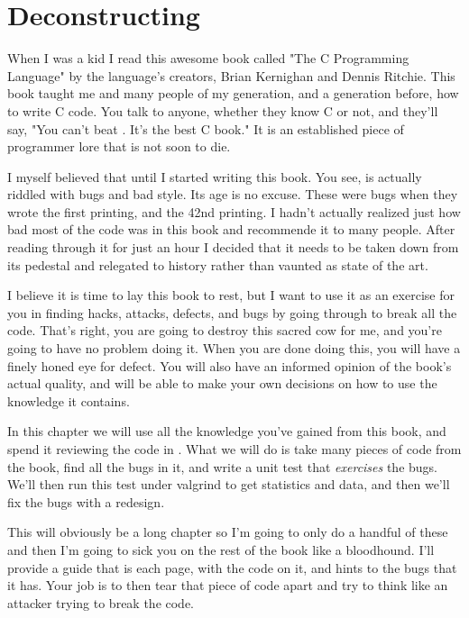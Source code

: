 \chapter{Deconstructing \krc}

When I was a kid I read this awesome book called "The C Programming Language"
by the language's creators, Brian Kernighan and Dennis Ritchie.  This book 
taught me and many people of my generation, and a generation before, how to
write C code.  You talk to anyone, whether they know C or not, and they'll
say, "You can't beat \krc. It's the best C book."  It is an established
piece of programmer lore that is not soon to die.

I myself believed that until I started writing this book. You see, \krc is
actually riddled with bugs and bad style.  Its age is no excuse. These were
bugs when they wrote the first printing, and the 42nd printing.  I hadn't
actually realized just how bad most of the code was in this book and recommende
it to many people.  After reading through it for just an hour I decided that it
needs to be taken down from its pedestal and relegated to history rather than
vaunted as state of the art.

I believe it is time to lay this book to rest, but I want to use it as an
exercise for you in finding hacks, attacks, defects, and bugs by going through
\krc to break all the code.  That's right, you are going to destroy this
sacred cow for me, and you're going to have no problem doing it.  When you are
done doing this, you will have a finely honed eye for defect.  You will also
have an informed opinion of the book's actual quality, and will be able to make
your own decisions on how to use the knowledge it contains.

In this chapter we will use all the knowledge you've gained from
this book, and spend it reviewing the code in \krc.  What we will do is
take many pieces of code from the book, find all the bugs in it, and write
a unit test that \emph{exercises} the bugs.  We'll then run this test under
valgrind to get statistics and data, and then we'll fix the bugs with a redesign.

This will obviously be a long chapter so I'm going to only do a handful of
these and then I'm going to sick you on the rest of the book like a bloodhound.
I'll provide a guide that is each page, with the code on it, and hints to the
bugs that it has.  Your job is to then tear that piece of code apart and try to
think like an attacker trying to break the code.

